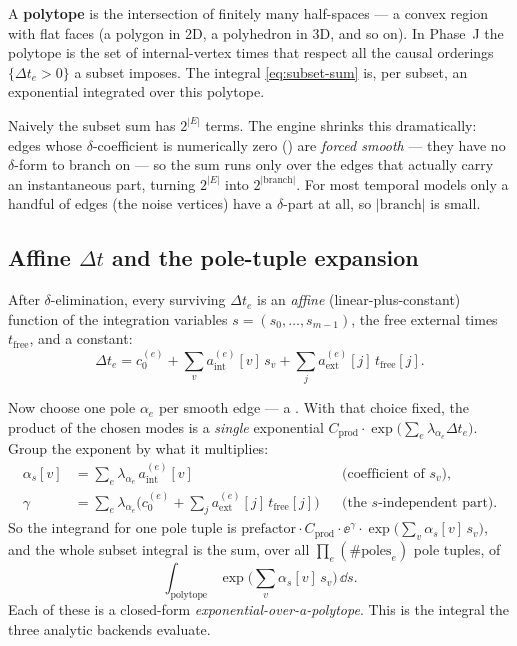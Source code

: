 \begin{defn}
A \textbf{polytope} is the intersection of finitely many half-spaces --- a
convex region with flat faces (a polygon in 2D, a polyhedron in 3D, and so on).
In Phase~J the polytope is the set of internal-vertex times that respect all the
causal orderings $\{\Delta t_e > 0\}$ a subset imposes. The integral
\eqref{eq:subset-sum} is, per subset, an exponential integrated over this
polytope.
\end{defn}

\begin{gotcha}
Naively the subset sum has $2^{|E|}$ terms. The engine shrinks this
dramatically: edges whose $\delta$-coefficient is numerically zero
() are \emph{forced smooth} --- they have no
$\delta$-form to branch on --- so the sum runs only over the edges that actually
carry an instantaneous part, turning $2^{|E|}$ into $2^{|\text{branch}|}$. For
most temporal models only a handful of edges (the noise vertices) have a
$\delta$-part at all, so $|\text{branch}|$ is small.
\end{gotcha}

\subsection{Affine $\Delta t$ and the pole-tuple expansion}

After $\delta$-elimination, every surviving $\Delta t_e$ is an \emph{affine}
(linear-plus-constant) function of the integration variables
$s = (s_0, \dots, s_{m-1})$, the free external times $t_{\text{free}}$, and a
constant:
\begin{equation}
  \Delta t_e = c^{(e)}_0 + \sum_v a^{(e)}_{\text{int}}[v]\, s_v + \sum_j a^{(e)}_{\text{ext}}[j]\, t_{\text{free}}[j].
  \label{eq:dt-affine}
\end{equation}

Now choose one pole $\alpha_e$ per smooth edge --- a . With that
choice fixed, the product of the chosen modes is a \emph{single} exponential
$C_{\text{prod}}\cdot\exp\!\big(\sum_e \lambda_{\alpha_e}\Delta t_e\big)$. Group
the exponent by what it multiplies:
\begin{align}
  \alpha_s[v]  &= \sum_e \lambda_{\alpha_e}\, a^{(e)}_{\text{int}}[v]   &&\text{(coefficient of } s_v\text{)}, \label{eq:alpha-s}\\
  \gamma       &= \sum_e \lambda_{\alpha_e}\Big(c^{(e)}_0 + \sum_j a^{(e)}_{\text{ext}}[j]\,t_{\text{free}}[j]\Big) &&\text{(the } s\text{-independent part)}. \label{eq:gamma}
\end{align}
So the integrand for one pole tuple is
$\text{prefactor}\cdot C_{\text{prod}}\cdot \ee^{\gamma}\cdot \exp\!\big(\sum_v \alpha_s[v]\,s_v\big)$,
and the whole subset integral is the sum, over all
$\prod_e (\#\text{poles}_e)$ pole tuples, of
\begin{equation}
  \int_{\text{polytope}} \exp\!\Big(\sum_v \alpha_s[v]\,s_v\Big)\,\dd s.
  \label{eq:exp-over-polytope}
\end{equation}
Each of these is a closed-form \emph{exponential-over-a-polytope}. This is the
integral the three analytic backends evaluate.

